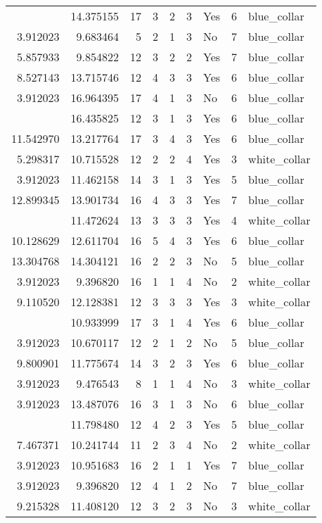 \documentclass[
]{article}
\begin{document}
\begin{longtable}[t]{rrrrrllrl}
\addlinespace
14.285545 & 14.375155 & 17 & 3 & 2 & 3 & Yes & 6 & blue\_collar\\
3.912023 & 9.683464 & 5 & 2 & 1 & 3 & No & 7 & blue\_collar\\
5.857933 & 9.854822 & 12 & 3 & 2 & 2 & Yes & 7 & blue\_collar\\
8.527143 & 13.715746 & 12 & 4 & 3 & 3 & Yes & 6 & blue\_collar\\
3.912023 & 16.964395 & 17 & 4 & 1 & 3 & No & 6 & blue\_collar\\
\addlinespace
3.912023 & 16.435825 & 12 & 3 & 1 & 3 & Yes & 6 & blue\_collar\\
11.542970 & 13.217764 & 17 & 3 & 4 & 3 & Yes & 6 & blue\_collar\\
5.298317 & 10.715528 & 12 & 2 & 2 & 4 & Yes & 3 & white\_collar\\
3.912023 & 11.462158 & 14 & 3 & 1 & 3 & Yes & 5 & blue\_collar\\
12.899345 & 13.901734 & 16 & 4 & 3 & 3 & Yes & 7 & blue\_collar\\
\addlinespace
6.956545 & 11.472624 & 13 & 3 & 3 & 3 & Yes & 4 & white\_collar\\
10.128629 & 12.611704 & 16 & 5 & 4 & 3 & Yes & 6 & blue\_collar\\
13.304768 & 14.304121 & 16 & 2 & 2 & 3 & No & 5 & blue\_collar\\
3.912023 & 9.396820 & 16 & 1 & 1 & 4 & No & 2 & white\_collar\\
9.110520 & 12.128381 & 12 & 3 & 3 & 3 & Yes & 3 & white\_collar\\
\addlinespace
3.912023 & 10.933999 & 17 & 3 & 1 & 4 & Yes & 6 & blue\_collar\\
3.912023 & 10.670117 & 12 & 2 & 1 & 2 & No & 5 & blue\_collar\\
9.800901 & 11.775674 & 14 & 3 & 2 & 3 & Yes & 6 & blue\_collar\\
3.912023 & 9.476543 & 8 & 1 & 1 & 4 & No & 3 & white\_collar\\
3.912023 & 13.487076 & 16 & 3 & 1 & 3 & No & 6 & blue\_collar\\
\addlinespace
7.279319 & 11.798480 & 12 & 4 & 2 & 3 & Yes & 5 & blue\_collar\\
7.467371 & 10.241744 & 11 & 2 & 3 & 4 & No & 2 & white\_collar\\
3.912023 & 10.951683 & 16 & 2 & 1 & 1 & Yes & 7 & blue\_collar\\
3.912023 & 9.396820 & 12 & 4 & 1 & 2 & No & 7 & blue\_collar\\
9.215328 & 11.408120 & 12 & 3 & 2 & 3 & No & 3 & white\_collar\\

\end{longtable}
\end{document}
